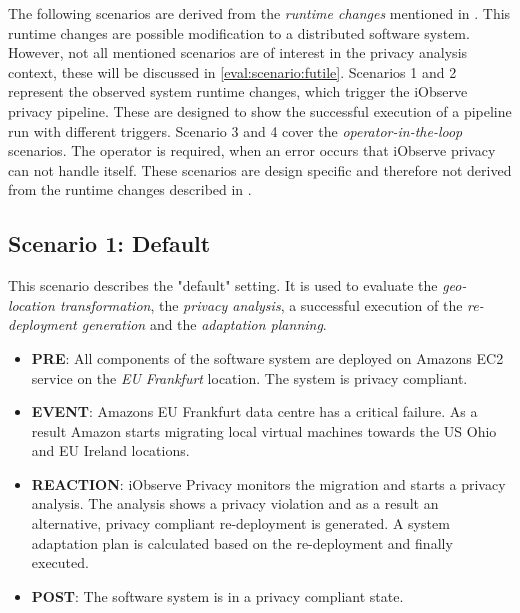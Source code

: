 The following scenarios are derived from the \textit{runtime changes} mentioned in \cite{Heinrich.2016b}. This runtime changes are possible modification to a distributed software system. However, not all mentioned scenarios are of interest in the privacy analysis context, these will be discussed in \autoref{eval:scenario:futile}. Scenarios 1 and 2 represent the observed system runtime changes, which trigger the iObserve privacy pipeline. These are designed to show the successful execution of a pipeline run with different triggers. Scenario 3 and 4 cover the \textit{operator-in-the-loop} scenarios. The operator is required, when an error occurs that iObserve privacy can not handle itself. These scenarios are design specific and therefore not derived from the runtime changes described in \cite{Heinrich.2016b}.

\subsection{Scenario 1: Default}
\label{eval:scenario:1}
This scenario describes the "default" setting. It is used to evaluate the \textit{geo-location transformation}, the \textit{privacy analysis}, a successful execution of the \textit{re-deployment generation} and the \textit{adaptation planning}.

\begin{itemize}
	\setlength\itemsep{0em}
	\item \textbf{PRE}: All components of the software system are deployed on Amazons EC2 service on the \textit{EU Frankfurt} location. The system is privacy compliant.
	\item \textbf{EVENT}: Amazons EU Frankfurt data centre has a critical failure. As a result Amazon starts migrating local virtual machines towards the US Ohio and EU Ireland locations.
	\item \textbf{REACTION}: iObserve Privacy monitors the migration and starts a privacy analysis. The analysis shows a privacy violation and as a result an alternative, privacy compliant re-deployment is generated. A system adaptation plan is calculated based on the re-deployment and finally executed.
	\item \textbf{POST}: The software system is in a privacy compliant state.
\end{itemize}

